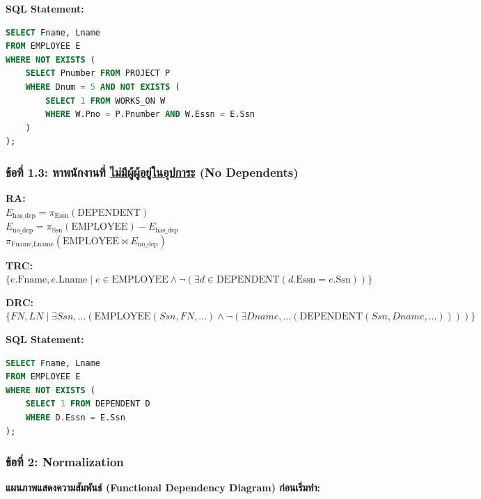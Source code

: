 \documentclass[a4paper,12pt]{article}
\begin{document}
\textbf{SQL Statement:}
\begin{lstlisting}[language=SQL]
SELECT Fname, Lname 
FROM EMPLOYEE E
WHERE NOT EXISTS (
    SELECT Pnumber FROM PROJECT P
    WHERE Dnum = 5 AND NOT EXISTS (
        SELECT 1 FROM WORKS_ON W 
        WHERE W.Pno = P.Pnumber AND W.Essn = E.Ssn
    )
); 
\end{lstlisting}

\vspace{0.3cm}
\subsubsection*{ข้อที่ 1.3: หาพนักงานที่ \underline{ไม่มีผู้ผู้อยู่ในอุปการะ} (No Dependents)}

\textbf{RA:}\\
$ E_{\text{has\_dep}} = \pi_{\text{Essn}}(\text{DEPENDENT}) $ \\
$ E_{\text{no\_dep}} = \pi_{\text{Ssn}}(\text{EMPLOYEE}) - E_{\text{has\_dep}} $ \\
$ \pi_{\text{Fname}, \text{Lname}} (\text{EMPLOYEE} \bowtie E_{\text{no\_dep}}) $

\textbf{TRC:}\\
$ \{ e.\text{Fname}, e.\text{Lname} \mid e \in \text{EMPLOYEE} \land \neg(\exists d \in \text{DEPENDENT} (d.\text{Essn} = e.\text{Ssn})) \} $

\textbf{DRC:}\\
$ \{ FN, LN \mid \exists Ssn, \dots (\text{EMPLOYEE}(Ssn, FN, \dots) \land \neg(\exists Dname, \dots (\text{DEPENDENT}(Ssn, Dname, \dots)))) \} $

\textbf{SQL Statement:}
\begin{lstlisting}[language=SQL]
SELECT Fname, Lname
FROM EMPLOYEE E
WHERE NOT EXISTS (
    SELECT 1 FROM DEPENDENT D
    WHERE D.Essn = E.Ssn
);
\end{lstlisting}

\subsubsection*{ข้อที่ 2: Normalization}
\textbf{แผนภาพแสดงความสัมพันธ์ (Functional Dependency Diagram) ก่อนเริ่มทำ:}
\end{document}
